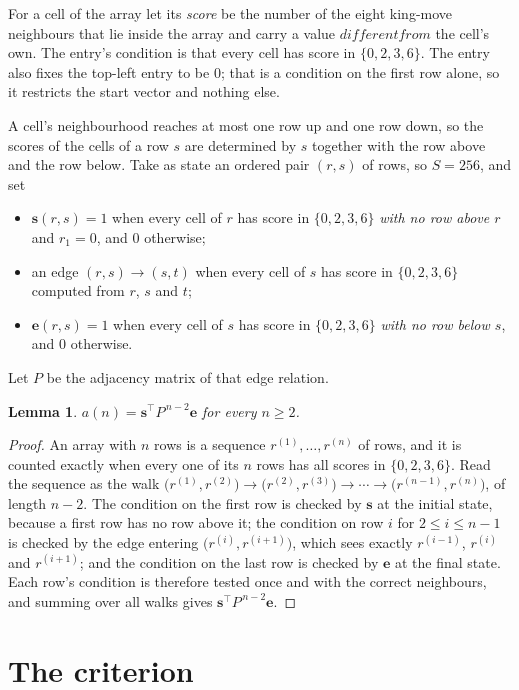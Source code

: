 \documentclass[11pt,a4paper]{article}
\theoremstyle{plain}
\newtheorem{lemma}[theorem]{Lemma}
\theoremstyle{definition}
\begin{document}
For a cell of the array let its \emph{score} be the number of the eight king-move neighbours that lie inside
the array and carry a value $different from$ the cell's own. The entry's condition is that every cell
has score in $\{0,2,3,6\}$. The entry also fixes the top-left entry to be $0$; that is a condition on the first row alone, so it restricts the start vector and nothing else.

A cell's neighbourhood reaches at most one row up and one row down, so the scores of the
cells of a row $s$ are determined by $s$ together with the row above and the row below.
Take as state an ordered pair $(r,s)$ of rows, so $S=256$, and set
\begin{itemize}
\item $\mathbf{s}(r,s)=1$ when every cell of $r$ has score in $\{0,2,3,6\}$ \emph{with no row
above $r$} and $r_1=0$, and $0$ otherwise;
\item an edge $(r,s)\to(s,t)$ when every cell of $s$ has score in $\{0,2,3,6\}$ computed from
$r$, $s$ and $t$;
\item $\mathbf{e}(r,s)=1$ when every cell of $s$ has score in $\{0,2,3,6\}$ \emph{with no row
below $s$}, and $0$ otherwise.
\end{itemize}
Let $P$ be the adjacency matrix of that edge relation.

\begin{lemma}\label{lem:walk}
$a(n)=\mathbf{s}^{\!\top}P^{\,n-2}\mathbf{e}$ for every $n\ge2$.
\end{lemma}

\begin{proof}
An array with $n$ rows is a sequence $r^{(1)},\dots,r^{(n)}$ of rows, and it is counted
exactly when every one of its $n$ rows has all scores in $\{0,2,3,6\}$. Read the sequence as the
walk $\bigl(r^{(1)},r^{(2)}\bigr)\to\bigl(r^{(2)},r^{(3)}\bigr)\to\cdots\to
\bigl(r^{(n-1)},r^{(n)}\bigr)$, of length $n-2$. The condition on the first row is
checked by $\mathbf{s}$ at the initial state, because a first row has no row above it; the
condition on row $i$ for $2\le i\le n-1$ is checked by the edge entering
$\bigl(r^{(i)},r^{(i+1)}\bigr)$, which sees exactly $r^{(i-1)}$, $r^{(i)}$ and
$r^{(i+1)}$; and the condition on the last row is checked by $\mathbf{e}$ at the final
state. Each row's condition is therefore tested once and with the correct neighbours, and
summing over all walks gives $\mathbf{s}^{\!\top}P^{\,n-2}\mathbf{e}$.
\end{proof}

\section{The criterion}
\end{document}
